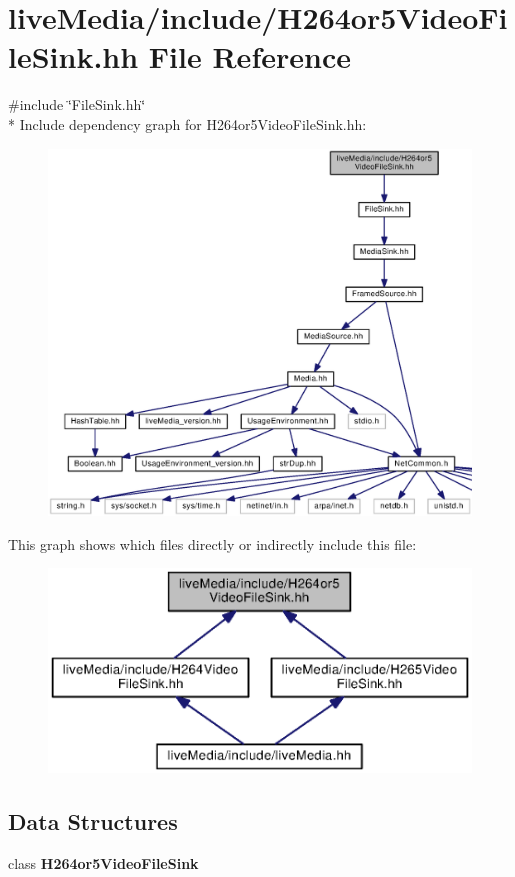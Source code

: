 \section{live\+Media/include/\+H264or5\+Video\+File\+Sink.hh File Reference}
\label{H264or5VideoFileSink_8hh}
{\ttfamily \#include \char`\"{}File\+Sink.\+hh\char`\"{}}\\*
Include dependency graph for H264or5\+Video\+File\+Sink.\+hh\+:
\nopagebreak
\begin{figure}[H]
\begin{center}
\leavevmode
\includegraphics[width=350pt]{H264or5VideoFileSink_8hh__incl}
\end{center}
\end{figure}
This graph shows which files directly or indirectly include this file\+:
\nopagebreak
\begin{figure}[H]
\begin{center}
\leavevmode
\includegraphics[width=350pt]{H264or5VideoFileSink_8hh__dep__incl}
\end{center}
\end{figure}
\subsection*{Data Structures}
\begin{DoxyCompactItemize}
\item 
class {\bf H264or5\+Video\+File\+Sink}
\end{DoxyCompactItemize}

